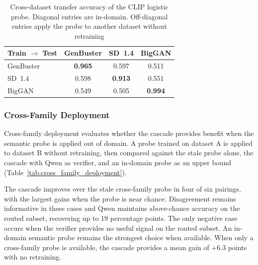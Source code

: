 \documentclass{ieeeaccess}
\begin{document}
\begin{table}[h]
\centering
\caption{Cross-dataset transfer accuracy of the CLIP logistic probe. Diagonal entries
are in-domain. Off-diagonal entries apply the probe to another dataset without
retraining}

\label{tab:clip_transfer}
\begin{tabular}{lccc}
\toprule
Train $\rightarrow$ Test & GenBuster & SD~1.4 & BigGAN \\
\midrule
GenBuster & \textbf{0.965} & 0.597 & 0.511 \\
SD~1.4    & 0.598 & \textbf{0.913} & 0.551 \\
BigGAN    & 0.549 & 0.505 & \textbf{0.994} \\
\bottomrule
\end{tabular}
\end{table}

\subsubsection{Cross-Family Deployment}
\label{sec:cross_family_deployment}

Cross-family deployment evaluates whether the cascade provides benefit when the semantic
probe is applied out of domain. A probe trained on dataset A is applied to dataset B
without retraining, then compared against the stale probe alone, the cascade with Qwen
as verifier, and an in-domain probe as an upper bound (Table~\ref{tab:cross_family_deployment}).

The cascade improves over the stale cross-family probe in four of six pairings, with the
largest gains when the probe is near chance. Disagreement remains informative in these
cases and Qwen maintains above-chance accuracy on the routed subset, recovering up to 19
percentage points. The only negative case occurs when the verifier provides no useful
signal on the routed subset. An in-domain semantic probe remains the strongest choice
when available. When only a cross-family probe is available, the cascade provides a mean
gain of $+$6.3 points with no retraining.
\end{document}

